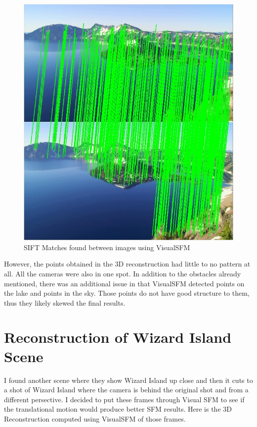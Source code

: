 \documentclass[11pt,psfig]{article}
\begin{document}
\begin{figure}[H]
\centering
\includegraphics[width=\columnwidth]{sfmResults1/shot14_26_siftMatches.jpg}
\caption{SIFT Matches found between images using VisualSFM}
\end{figure}

\newpage

However, the points obtained in the 3D reconstruction had little to no pattern at all. All the cameras were also in one spot. In addition to the obstacles already mentioned, there was an additional issue in that VisualSFM detected points on the lake and points in the sky. Those points do not have good structure to them, thus they likely skewed the final results. 

\newpage

\section{Reconstruction of Wizard Island Scene}

I found another scene where they show Wizard Island up close and then it cuts to a shot of Wizard Island where the camera is behind the original shot and from a different persective. I decided to put these frames through Visual SFM to see if the translational motion would produce better SFM results. Here is the 3D Reconstruction computed using VisualSFM of those frames. 
\end{document}
